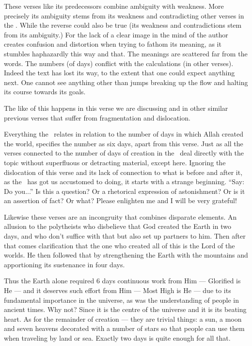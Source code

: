 \documentclass[12pt]{memoir}
\begin{document}
These verses like its predecessors combine ambiguity with weakness.
More precisely its ambiguity stems from its weakness
and contradicting other verses in the \Quran.
While the reverse could also be true
(its weakness and contradictions stem from its ambiguity.)
For the lack of a clear image in the mind of the author creates confusion
and distortion when trying to fathom its meaning,
as it stumbles haphazardly this way and that.
The meanings are scattered far from the words.
The numbers (of days) conflict with the calculations (in other verses).
Indeed the text has lost its way,
to the extent that one could expect anything next.
One cannot see anything other than jumps breaking up the flow
and halting its course towards its goals.

The like of this happens in this verse we are discussing
and in other similar previous verses
that suffer from fragmentation and dislocation.

Everything the \Quran\ relates in relation to the number of days
in which Allah created the world, specifies the number as six days,
apart from this verse.
Just as all the verses connected to the number of days of creation
in the \Quran\ deal directly with the topic without superfluous
or detracting material, except here.
Ignoring the dislocation of this verse
and its lack of connection to what is before and after it,
as the \Quran\ has got us accustomed to doing,
it starts with a strange beginning.
“Say: Do you...” Is this a question?
Or a rhetorical expression of astonishment?
Or is it an assertion of fact?
Or what? Please enlighten me and I will be very grateful!

Likewise these verses are an incongruity that combines disparate elements.
An allusion to the polytheists who disbelieve
that God created the Earth in two days,
and who don’t suffice with that but also set up partners to him.
Then after that comes clarification that the one who created all of this
is the Lord of the worlds.
He then followed that by strengthening the Earth with the mountains
and apportioning its sustenance in four days.

Thus the Earth alone required 6 days continuous work from  Him —
Glorified is He — and it deserves such effort from Him — Most High is He —
due to its fundamental importance in the universe,
as was the understanding of people in ancient times.
Why not? Since it is the centre of the universe and it is its beating heart.
As for the remainder of creation — they are trivial things:
a sun, a moon and seven heavens decorated with a number of stars
so that people can use them when traveling by land or sea.
Exactly two days is quite enough for all that.
\end{document}

